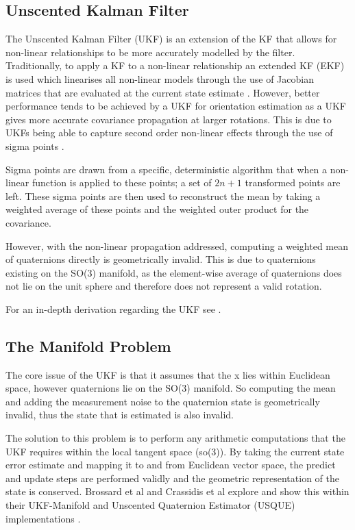\subsection{Unscented Kalman Filter}
The Unscented Kalman Filter (UKF) is an extension of the KF that allows for non-linear relationships to be more accurately modelled by the filter. 
Traditionally, to apply a KF to a non-linear relationship an extended KF (EKF) is used which linearises all non-linear 
models through the use of Jacobian matrices that are evaluated at the current state estimate \cite{julier_1997_a}.  
However, better performance tends to be achieved by a UKF for orientation estimation as a UKF gives more accurate covariance propagation at 
larger rotations. This is due to UKFs being able to capture second order non-linear effects through the use of sigma points \cite{julier_1997_a} \cite{kraft_2003_a}.

Sigma points are drawn from a specific, deterministic algorithm that when a non-linear function is applied to these points; a set of $2n + 1$ transformed
points are left.
These sigma points are then used to reconstruct the mean by taking a weighted average of these points and the weighted outer product
for the covariance. 

However, with the non-linear propagation addressed, computing a weighted mean of quaternions directly is geometrically invalid. This is due to
quaternions existing on the SO(3) manifold, as the element-wise average of quaternions does not lie on the unit sphere and therefore does not represent a valid rotation.  

For an in-depth derivation regarding the UKF see \cite{julier_1997_a}.

\subsection{The Manifold Problem}
The core issue of the UKF is that it assumes that the x lies within Euclidean space, however quaternions lie on the SO(3) manifold. So computing the mean
and adding the measurement noise to the quaternion state is geometrically invalid, thus the state that is estimated is also invalid.

The solution to this problem is to perform any arithmetic computations that the UKF requires within the local tangent space (so(3)). By taking the current 
state error estimate and mapping it to and from Euclidean vector space, the predict and update steps are performed validly 
and the geometric representation of the state is conserved. Brossard et al and Crassidis et al
explore and show this within their UKF-Manifold and Unscented Quaternion Estimator (USQUE) implementations \cite{brossard_2020_a} \cite{crassidis_unscented}.

